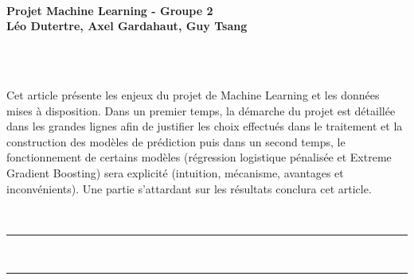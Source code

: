 \documentclass[french]{article}
\makeatletter
\def\vhrulefill#1{\leavevmode\leaders\hrule\@height#1\hfill \kern\z@}
\renewenvironment{abstract} %
 {\par\noindent\textbf{\abstractname}\ \ignorespaces\\}
 {\par\medskip}
\makeatother
\begin{document}
\noindent\begin{minipage}{\textwidth}

\ \\[30pt]

{\LARGE \bf Projet Machine Learning - Groupe 2} \\

{\large \bf Léo Dutertre, 
            Axel Gardahaut, 
            Guy Tsang}



\end{minipage}

\



\null

\begin{abstract}
Cet article présente les enjeux du projet de Machine Learning et les données mises à disposition. Dans un premier temps, la démarche du projet est détaillée dans les grandes lignes afin de justifier les choix effectués dans le traitement et la construction des modèles de prédiction puis dans un second temps, le fonctionnement de certains modèles (régression logistique pénalisée et Extreme Gradient Boosting) sera explicité (intuition, mécanisme, avantages et inconvénients). Une partie s'attardant sur les résultats conclura cet article.
\end{abstract}


\

\noindent \vhrulefill{1.5pt} ~ ~ \vhrulefill{1.5pt}
\end{document}
